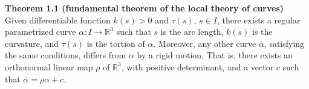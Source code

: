 \documentclass{article}
\begin{document}
\par
\textbf{Theorem 1.1 (fundamental theorem of the local theory of curves)}\\
Given differentiable function $k(s)>0$ and $\tau(s)$, $s \in I$, there exists a regular
parametrized curve $\alpha: I \to \mathbb{R}^3$ such that $s$ is the arc length, $k(s)$ is
the curvature, and $\tau(s)$ is the tortion of $\alpha$. Moreover, any other curve 
$\overline{\alpha}$, satisfying the same conditions, differs from $\alpha$ by a rigid motion.
That is, there exists an orthonormal linear map $\rho$ of $\mathbb{R}^3$, with positive
determinant, and a vector $c$ such that $\overline{\alpha} = \rho \alpha + c$.
\end{document}
